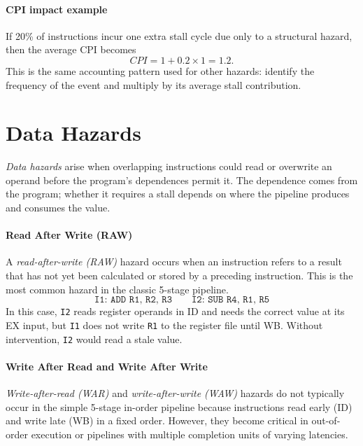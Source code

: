 \paragraph{CPI impact example}\label{par:auto-022a}
If 20\% of instructions incur one extra stall cycle due only to a structural hazard, then the average CPI becomes
\begin{equation}\label{eq:auto-041a}
    CPI = 1 + 0.2 \times 1 = 1.2.
\end{equation}
This is the same accounting pattern used for other hazards: identify the frequency of the event and multiply by its average stall contribution.


\section{Data Hazards}\label{sec:auto-040}
\textit{Data hazards} arise when overlapping instructions could read or overwrite an operand before the program's dependences permit it.
The dependence comes from the program; whether it requires a stall depends on where the pipeline produces and consumes the value.

\paragraph{Read After Write (RAW)}\label{par:auto-023}
A \textit{read-after-write (RAW)} hazard occurs when an instruction refers to a result that has not yet been calculated or stored by a preceding instruction.
This is the most common hazard in the classic 5-stage pipeline.
\begin{equation}\label{eq:auto-042}
    \texttt{I1: ADD R1, R2, R3} \qquad \texttt{I2: SUB R4, R1, R5}
\end{equation}
In this case, \texttt{I2} reads register operands in ID and needs the correct value at its EX input, but \texttt{I1} does not write \texttt{R1} to the register file until WB.
Without intervention, \texttt{I2} would read a stale value.

\paragraph{Write After Read and Write After Write}\label{par:auto-024}
\textit{Write-after-read (WAR)} and \textit{write-after-write (WAW)} hazards do not typically occur in the simple 5-stage in-order pipeline because instructions read early (ID) and write late (WB) in a fixed order.
However, they become critical in out-of-order execution or pipelines with multiple completion units of varying latencies.

